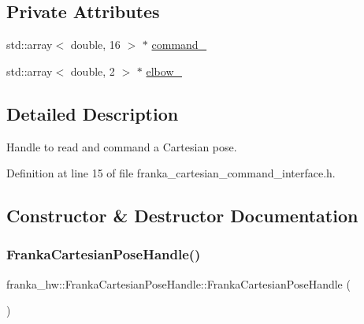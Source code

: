 \subsection*{Private Attributes}
\begin{DoxyCompactItemize}
\item 
std\+::array$<$ double, 16 $>$ $\ast$ \hyperlink{classfranka__hw_1_1FrankaCartesianPoseHandle_a241d690f13da4ef26f80e893072e9584}{command\+\_\+}
\item 
std\+::array$<$ double, 2 $>$ $\ast$ \hyperlink{classfranka__hw_1_1FrankaCartesianPoseHandle_a24d9028a55a8a3bae39c9972c21e009f}{elbow\+\_\+}
\end{DoxyCompactItemize}


\subsection{Detailed Description}
Handle to read and command a Cartesian pose. 

Definition at line 15 of file franka\+\_\+cartesian\+\_\+command\+\_\+interface.\+h.



\subsection{Constructor \& Destructor Documentation}
\mbox{\label{classfranka__hw_1_1FrankaCartesianPoseHandle_ad1813fa7937997edc506dc95dbf35b40}} 
\subsubsection{\texorpdfstring{Franka\+Cartesian\+Pose\+Handle()}{FrankaCartesianPoseHandle()}\hspace{0.1cm}{\footnotesize\ttfamily [1/2]}}
{\footnotesize\ttfamily franka\+\_\+hw\+::\+Franka\+Cartesian\+Pose\+Handle\+::\+Franka\+Cartesian\+Pose\+Handle (\begin{DoxyParamCaption}{ }\end{DoxyParamCaption})\hspace{0.3cm}{\ttfamily [delete]}}

